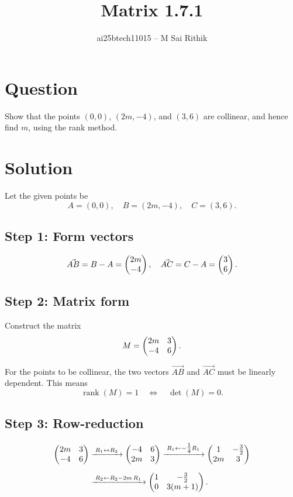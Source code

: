 \documentclass[12pt]{article}
\title{Matrix 1.7.1}
\author{ai25btech11015 -- M Sai Rithik}
\date{}
\begin{document}
\maketitle

\section*{Question}
Show that the points \((0,0)\), \((2m,-4)\), and \((3,6)\) are collinear, and hence find \(m\), using the rank method.

\section*{Solution}

Let the given points be
\[
A = (0,0), \quad B = (2m,-4), \quad C = (3,6).
\]

\subsection*{Step 1: Form vectors}
\[
\Vec{AB} = B - A = \myvec{2m \\ -4}, 
\quad \Vec{AC} = C - A = \myvec{3 \\ 6}.
\]

\subsection*{Step 2: Matrix form}
Construct the matrix
\[
M = \myvec{2m & 3 \\ -4 & 6}.
\]

For the points to be collinear, the two vectors \(\Vec{AB}\) and \(\Vec{AC}\) must be linearly dependent.  
This means
\[
\operatorname{rank}(M) = 1 \quad \Leftrightarrow \quad \det(M) = 0.
\]

\subsection*{Step 3: Row-reduction}
\[
\begin{aligned}
\myvec{2m & 3 \\ -4 & 6}
&\xrightarrow{\;R_1 \leftrightarrow R_2\;}
\myvec{-4 & 6 \\ 2m & 3}
\xrightarrow{\;R_1\gets -\tfrac14 R_1\;}
\myvec{1 & -\tfrac{3}{2} \\ 2m & 3}\\[6pt]
&\xrightarrow{\;R_2\gets R_2-2m\,R_1\;}
\myvec{1 & -\tfrac{3}{2} \\ 0 & 3(m+1)}.
\end{aligned}
\]
\end{document}
